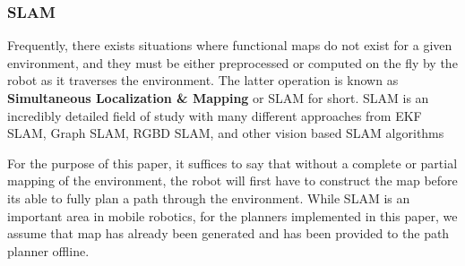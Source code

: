 



\subsubsection{SLAM}
Frequently, there exists situations where functional maps do not exist for a given environment, and they must be either preprocessed or computed on the fly by the robot as it traverses the environment. The latter operation is known as \textbf{Simultaneous Localization \& Mapping} or SLAM for short. SLAM is an incredibly detailed field of study with many different approaches from EKF SLAM, Graph SLAM, RGBD SLAM, and other vision based SLAM algorithms

For the purpose of this paper, it suffices to say that without a complete or partial mapping of the environment, the robot will first have to construct the map before its able to fully plan a path through the environment. While SLAM is an important area in mobile robotics, for the planners implemented in this paper, we assume that map has already been generated and has been provided to the path planner offline.

